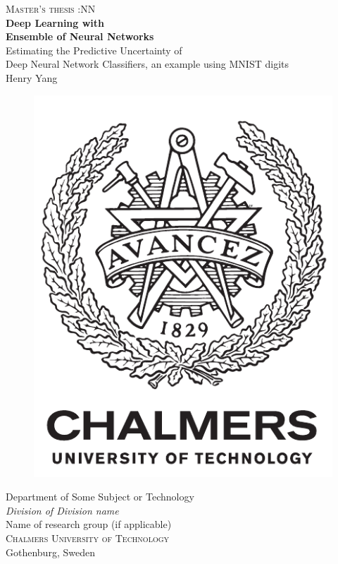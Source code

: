 \newpage
\thispagestyle{empty}
\begin{center}
	\textsc{\large Master's thesis \the\year:NN}\\[4cm]		%
	\textbf{\Large Deep Learning with \\ Ensemble of Neural Networks} \\[1cm]
	{\large Estimating the Predictive Uncertainty of \\Deep Neural Network Classifiers, an example using MNIST digits}\\[1cm]
	{\large Henry Yang}
	
	\vfill	
	\begin{figure}[H]
	\centering
	\includegraphics[width=0.2\pdfpagewidth]{figure/auxiliary/logo_eng.pdf} \\	
	\end{figure}	\vspace{5mm}	
	
	Department of Some Subject or Technology \\
	\emph{Division of Division name}\\
	Name of research group (if applicable)\\
	\textsc{Chalmers University of Technology} \\
	Gothenburg, Sweden \the\year \\
\end{center}



